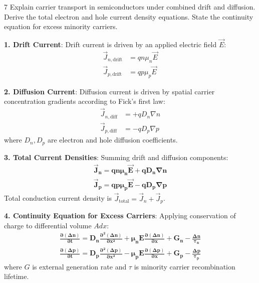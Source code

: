 \begin{theoryq}{7}
Explain carrier transport in semiconductors under combined drift and diffusion. Derive the total electron and hole current density equations. State the continuity equation for excess minority carriers.
\end{theoryq}
\begin{theorysol}
\textbf{1. Drift Current}:
Drift current is driven by an applied electric field $\vec{E}$:
\begin{align}
\vec{J}_{n,\text{drift}} &= q n \mu_n \vec{E} \\
\vec{J}_{p,\text{drift}} &= q p \mu_p \vec{E}
\end{align}

\textbf{2. Diffusion Current}:
Diffusion current is driven by spatial carrier concentration gradients according to Fick's first law:
\begin{align}
\vec{J}_{n,\text{diff}} &= +q D_n \nabla n \\
\vec{J}_{p,\text{diff}} &= -q D_p \nabla p
\end{align}
where $D_n, D_p$ are electron and hole diffusion coefficients.

\textbf{3. Total Current Densities}:
Summing drift and diffusion components:
\begin{align}
\mathbf{\vec{J}_n = q n \mu_n \vec{E} + q D_n \nabla n} \\
\mathbf{\vec{J}_p = q p \mu_p \vec{E} - q D_p \nabla p}
\end{align}
Total conduction current density is $\vec{J}_{\text{total}} = \vec{J}_n + \vec{J}_p$.

\textbf{4. Continuity Equation for Excess Carriers}:
Applying conservation of charge to differential volume $A dx$:
\begin{align}
\mathbf{\frac{\partial (\Delta n)}{\partial t} = D_n \frac{\partial^2 (\Delta n)}{\partial x^2} + \mu_n E \frac{\partial (\Delta n)}{\partial x} + G_n - \frac{\Delta n}{\tau_n}} \\
\mathbf{\frac{\partial (\Delta p)}{\partial t} = D_p \frac{\partial^2 (\Delta p)}{\partial x^2} - \mu_p E \frac{\partial (\Delta p)}{\partial x} + G_p - \frac{\Delta p}{\tau_p}}
\end{align}
where $G$ is external generation rate and $\tau$ is minority carrier recombination lifetime.
\end{theorysol}
\vspace{4mm}

